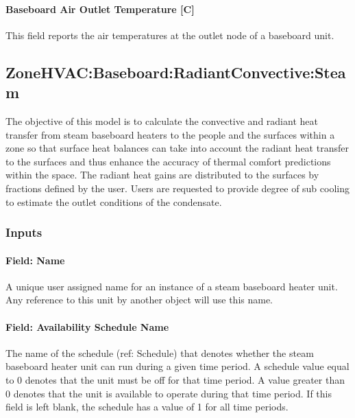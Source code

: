 \paragraph{Baseboard Air Outlet Temperature {[}C{]}}\label{baseboard-air-outlet-temperature-c}

This field reports the air temperatures at the outlet node of a baseboard unit.

\subsection{ZoneHVAC:Baseboard:RadiantConvective:Steam}\label{zonehvacbaseboardradiantconvectivesteam}

The objective of this model is to calculate the convective and radiant heat transfer from steam baseboard heaters to the people and the surfaces within a zone so that surface heat balances can take into account the radiant heat transfer to the surfaces and thus enhance the accuracy of thermal comfort predictions within the space. The radiant heat gains are distributed to the surfaces by fractions defined by the user. Users are requested to provide degree of sub cooling to estimate the outlet conditions of the condensate.

\subsubsection{Inputs}\label{inputs-1-035}

\paragraph{Field: Name}\label{field-name-1-034}

A unique user assigned name for an instance of a steam baseboard heater unit. Any reference to this unit by another object will use this name.

\paragraph{Field: Availability Schedule Name}\label{field-availability-schedule-name-1-010}

The name of the schedule (ref: Schedule) that denotes whether the steam baseboard heater unit can run during a given time period. A schedule value equal to 0 denotes that the unit must be off for that time period. A value greater than 0 denotes that the unit is available to operate during that time period. If this field is left blank, the schedule has a value of 1 for all time periods.

